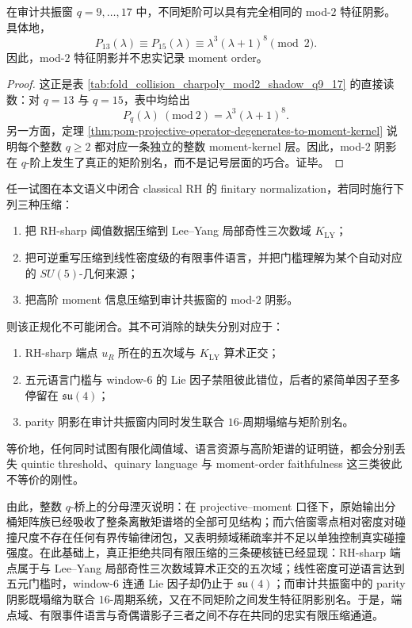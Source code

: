 \begin{proposition}\label{prop:xi-time-part9zj-resonance-window-mod2-order-aliasing}
在审计共振窗 \(q=9,\dots,17\) 中，不同矩阶可以具有完全相同的 mod-\(2\) 特征阴影。具体地，
\[
P_{13}(\lambda)\equiv P_{15}(\lambda)\equiv \lambda^3(\lambda+1)^8\pmod 2.
\]
因此，mod-\(2\) 特征阴影并不忠实记录 moment order。
\end{proposition}
\begin{proof}
这正是表 \ref{tab:fold_collision_charpoly_mod2_shadow_q9_17} 的直接读数：对 \(q=13\) 与 \(q=15\)，表中均给出
\[
P_q(\lambda)\ (\mathrm{mod}\ 2)=\lambda^3(\lambda+1)^8.
\]
另一方面，定理 \ref{thm:pom-projective-operator-degenerates-to-moment-kernel} 说明每个整数 \(q\ge 2\) 都对应一条独立的整数 moment-kernel 层。因此，mod-\(2\) 阴影在 \(q\)-阶上发生了真正的矩阶别名，而不是记号层面的巧合。证毕。
\end{proof}

\begin{conjecture}\label{conj:xi-time-part9zj-quintic-quinary-parity-triple-hardcore}
任一试图在本文语义中闭合 classical RH 的 finitary normalization，若同时施行下列三种压缩：
\begin{enumerate}
  \item 把 RH-sharp 阈值数据压缩到 Lee--Yang 局部奇性三次数域 \(K_{\mathrm{LY}}\)；
  \item 把可逆重写压缩到线性密度级的有限事件语言，并把门槛理解为某个自动对应的 \(SU(5)\)-几何来源；
  \item 把高阶 moment 信息压缩到审计共振窗的 mod-\(2\) 阴影。
\end{enumerate}
则该正规化不可能闭合。其不可消除的缺失分别对应于：
\begin{enumerate}
  \item RH-sharp 端点 \(u_R\) 所在的五次域与 \(K_{\mathrm{LY}}\) 算术正交；
  \item 五元语言门槛与 window-\(6\) 的 Lie 因子禁阻彼此错位，后者的紧简单因子至多停留在 \(\mathfrak{su}(4)\)；
  \item parity 阴影在审计共振窗内同时发生联合 \(16\)-周期塌缩与矩阶别名。
\end{enumerate}
等价地，任何同时试图有限化阈值域、语言资源与高阶矩谱的证明链，都会分别丢失 quintic threshold、quinary language 与 moment-order faithfulness 这三类彼此不等价的刚性。
\end{conjecture}

\noindent
由此，整数 \(q\)-桥上的分母湮灭说明：在 projective--moment 口径下，原始输出分桶矩阵族已经吸收了整条离散矩谱塔的全部可见结构；而六倍窗零点相对密度对碰撞尺度不存在任何有界传输律闭包，又表明频域稀疏率并不足以单独控制真实碰撞强度。在此基础上，真正拒绝共同有限压缩的三条硬核链已经显现：RH-sharp 端点属于与 Lee--Yang 局部奇性三次数域算术正交的五次域；线性密度可逆语言达到五元门槛时，window-\(6\) 连通 Lie 因子却仍止于 \(\mathfrak{su}(4)\)；而审计共振窗中的 parity 阴影既塌缩为联合 \(16\)-周期系统，又在不同矩阶之间发生特征阴影别名。于是，端点域、有限事件语言与奇偶谱影子三者之间不存在共同的忠实有限压缩通道。

\endinput
